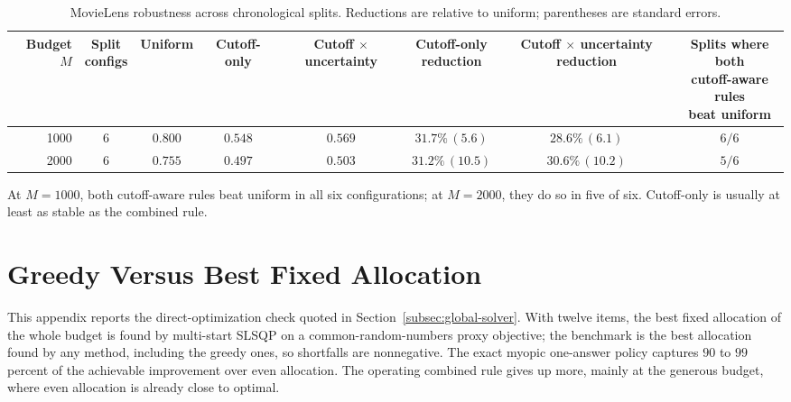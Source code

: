 \documentclass[11pt]{article}
\theoremstyle{definition}
\theoremstyle{remark}
\newcommand{\1}{\mathbf{1}}
\begin{document}
\begin{table}[t]
\centering
\scriptsize
\setlength{\tabcolsep}{4pt}
\begin{tabular}{rccccccc}
\toprule
Budget $M$ & \shortstack{Split\\configs} & Uniform & Cutoff-only & \shortstack{Cutoff $\times$\\uncertainty} & \shortstack{Cutoff-only\\reduction} & \shortstack{Cutoff $\times$ uncertainty\\reduction} & \shortstack{Splits where both\\cutoff-aware rules\\beat uniform} \\
\midrule
1000 & 6 & $0.800$ & $0.548$ & $0.569$ & $31.7\%\,(5.6)$ & $28.6\%\,(6.1)$ & $6/6$ \\
2000 & 6 & $0.755$ & $0.497$ & $0.503$ & $31.2\%\,(10.5)$ & $30.6\%\,(10.2)$ & $5/6$ \\
\bottomrule
\end{tabular}
\caption{MovieLens robustness across chronological splits. Reductions are relative to uniform; parentheses are standard errors.}
\label{tab:movielens_multisplit}
\end{table}

At \(M=1000\), both cutoff-aware rules beat uniform in all six
configurations; at \(M=2000\), they do so in five of six. Cutoff-only
is usually at least as stable as the combined rule.

\section{Greedy Versus Best Fixed Allocation}
\label{app:greedy-optimal}

This appendix reports the direct-optimization check quoted in
Section~\ref{subsec:global-solver}. With twelve items, the best fixed
allocation of the whole budget is found by multi-start SLSQP on a
common-random-numbers proxy objective; the benchmark is the best
allocation found by any method, including the greedy ones, so
shortfalls are nonnegative. The exact myopic one-answer policy captures
\(90\) to \(99\) percent of the achievable improvement over even
allocation.
The operating combined rule gives up more, mainly at the generous
budget, where even allocation is already close to optimal.
\end{document}
